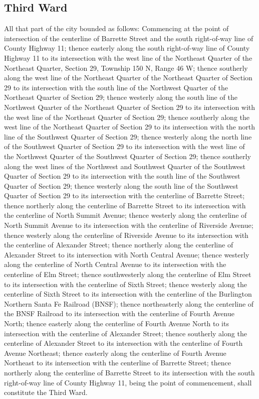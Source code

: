 \documentclass[code.tex]{subfiles}
\begin{document}
\subsection{Third Ward}
All that part of the city bounded as follows:  Commencing at the point of intersection of the centerline of Barrette Street and the south right-of-way line of County Highway 11; thence easterly along the south right-of-way line of County Highway 11 to its intersection with the west line of the Northeast Quarter of the Northeast Quarter, Section 29, Township 150 N, Range 46 W; thence southerly along the west line of the Northeast Quarter of the Northeast Quarter of Section 29 to its intersection with the south line of the Northwest Quarter of the Northeast Quarter of Section 29; thence westerly along the south line of the Northwest Quarter of the Northeast Quarter of Section 29 to its intersection with the west line of the Northeast Quarter of Section 29; thence southerly along the west line of the Northeast Quarter of Section 29 to its intersection with the north line of the Southwest Quarter of Section 29; thence westerly along the north line of the Southwest Quarter of Section 29 to its intersection with the west line of the Northwest Quarter of the Southwest Quarter of Section 29; thence southerly along the west lines of the Northwest and Southwest Quarter of the Southwest Quarter of Section 29 to its intersection with the south line of the Southwest Quarter of Section 29; thence westerly along the south line of the Southwest Quarter of Section 29 to its intersection with the centerline of Barrette Street; thence northerly along the centerline of Barrette Street to its intersection with the centerline of North Summit Avenue; thence westerly along the centerline of North Summit Avenue to its intersection with the centerline of Riverside Avenue; thence westerly along the centerline of Riverside Avenue to its intersection with the centerline of Alexander Street; thence northerly along the centerline of Alexander Street to its intersection with North Central Avenue; thence westerly along the centerline of North Central Avenue to its intersection with the centerline of Elm Street; thence southwesterly along the centerline of Elm Street to its intersection with the centerline of Sixth Street; thence westerly along the centerline of Sixth Street to its intersection with the centerline of the Burlington Northern Santa Fe Railroad (BNSF); thence northeasterly along the centerline of the BNSF Railroad to its intersection with the centerline of Fourth Avenue North; thence easterly along the centerline of Fourth Avenue North to its intersection with the centerline of Alexander Street; thence southerly along the centerline of Alexander Street to its intersection with the centerline of Fourth Avenue Northeast; thence easterly along the centerline of Fourth Avenue Northeast to its intersection with the centerline of Barrette Street; thence northerly along the centerline of Barrette Street to its intersection with the south right-of-way line of County Highway 11, being the point of commencement, shall constitute the Third Ward.
\end{document}
